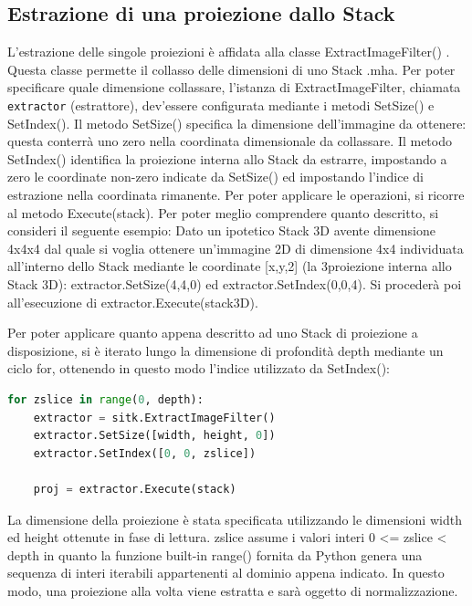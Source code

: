 \documentclass[a4paper,12pt, doubleside]{report}
\begin{document}
            \subsection{Estrazione di una proiezione dallo Stack}
                    L'estrazione delle singole proiezioni è affidata alla classe ExtractImageFilter() \cite{sitk-estractor}. Questa classe permette il collasso delle dimensioni di uno Stack .mha. Per poter specificare quale dimensione collassare, l'istanza di ExtractImageFilter, chiamata \texttt{extractor} (estrattore), dev'essere configurata mediante i metodi SetSize() e 
                    SetIndex(). Il metodo SetSize() specifica la dimensione dell'immagine da ottenere: questa conterrà uno zero nella coordinata dimensionale da collassare. Il metodo SetIndex() identifica la proiezione interna allo Stack da estrarre, impostando a zero le coordinate non-zero indicate da SetSize() ed impostando l'indice di estrazione nella coordinata rimanente. Per poter applicare le operazioni, si ricorre al metodo Execute(stack).
                    Per poter meglio comprendere quanto descritto, si consideri il seguente esempio:
                    Dato un ipotetico Stack 3D avente dimensione 4x4x4 dal quale si voglia ottenere un'immagine 2D di dimensione 4x4 individuata all'interno dello Stack mediante le coordinate [x,y,2] (la 3\degree proiezione interna allo Stack 3D): extractor.SetSize(4,4,0) ed extractor.SetIndex(0,0,4). Si procederà poi all'esecuzione di extractor.Execute(stack\textunderscore 3D).
                    
                \par
                    Per poter applicare quanto appena descritto ad uno Stack di proiezione a disposizione, si è iterato lungo la dimensione di profondità depth mediante un ciclo for, ottenendo in questo modo l'indice utilizzato da SetIndex():
                    
                    \begin{lstlisting}[language=python, frame=bt]
for zslice in range(0, depth):
    extractor = sitk.ExtractImageFilter()
    extractor.SetSize([width, height, 0])
    extractor.SetIndex([0, 0, zslice])

    proj = extractor.Execute(stack)
                    \end{lstlisting} 
                    
                    La dimensione della proiezione è stata specificata utilizzando le dimensioni width ed height ottenute in fase di lettura.
                    zslice assume i valori interi 0 <= zslice < depth in quanto la funzione built-in range()\cite{python-range} fornita da Python genera una sequenza di interi iterabili appartenenti al dominio appena indicato.
                    In questo modo, una proiezione alla volta viene estratta e sarà oggetto di normalizzazione.
                
\end{document}
